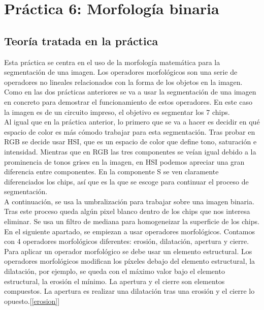 \documentclass[a4paper,12pt]{report}
\begin{document}
\section{ Práctica 6: Morfología binaria}
\subsection{Teoría tratada en la práctica}

Esta práctica se centra en el uso de la morfología matemática para la segmentación de una imagen. Los operadores morfológicos son una serie de operadores no lineales relacionados con la forma de los objetos en la imagen. Como en las dos prácticas anteriores se va a usar la segmentación de una imagen en concreto para demostrar el funcionamiento de estos operadores. En este caso la imagen es de un circuito impreso, el objetivo es segmentar los 7 chips.\\

Al igual que en la práctica anterior, lo primero que se va a hacer es decidir en qué espacio de color es más cómodo trabajar para esta segmentación. Tras probar en RGB se decide usar HSI, que es un espacio de color que define tono, saturación e intensidad. Mientras que en RGB las tres componentes se veían igual debido a la prominencia de tonos grises en la imagen, en HSI podemos apreciar una gran diferencia entre componentes. En la componente S se ven claramente diferenciados los chips, así que es la que se escoge para continuar el proceso de segmentación.\\

A continuación, se usa la umbralización para trabajar sobre una imagen binaria. Tras este proceso queda algún pixel blanco dentro de los chips que nos interesa eliminar. Se usa un filtro de mediana para homogeneizar la superficie de los chips.\\

En el siguiente apartado, se empiezan a usar operadores morfológicos. Contamos con 4 operadores morfológicos diferentes: erosión, dilatación, apertura y cierre. Para aplicar un operador morfológico se debe usar un elemento estructural. Los operadores morfológicos modifican los píxeles debajo del elemento estructural, la dilatación, por ejemplo, se queda con el máximo valor bajo el elemento estructural, la erosión el mínimo. La apertura y el cierre son elementos compuestos. La apertura es realizar una dilatación tras una erosión y el cierre lo opuesto.[\ref{erosion}]\\
\end{document}
